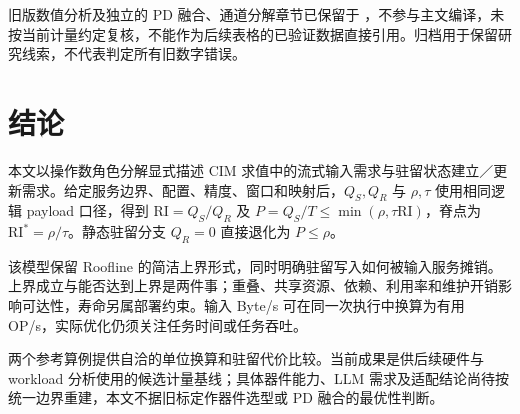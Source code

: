 \documentclass[11pt, a4paper]{ctexart}
\theoremstyle{definition}
\newcommand{\RI}{\mathrm{RI}}
\begin{document}
旧版数值分析及独立的 PD 融合、通道分解章节已保留于 ，不参与主文编译，未按当前计量约定复核，不能作为后续表格的已验证数据直接引用。归档用于保留研究线索，不代表判定所有旧数字错误。

\section{结论}
\label{sec:conclusion}

本文以操作数角色分解显式描述 CIM 求值中的流式输入需求与驻留状态建立／更新需求。给定服务边界、配置、精度、窗口和映射后，$Q_S,Q_R$ 与 $\rho,\tau$ 使用相同逻辑 payload 口径，得到 $\RI=Q_S/Q_R$ 及 $P=Q_S/T\le\min(\rho,\tau\RI)$，脊点为 $\RI^*=\rho/\tau$。静态驻留分支 $Q_R=0$ 直接退化为 $P\le\rho$。

该模型保留 Roofline 的简洁上界形式，同时明确驻留写入如何被输入服务摊销。上界成立与能否达到上界是两件事；重叠、共享资源、依赖、利用率和维护开销影响可达性，寿命另属部署约束。输入 Byte/s 可在同一次执行中换算为有用 OP/s，实际优化仍须关注任务时间或任务吞吐。

两个参考算例提供自洽的单位换算和驻留代价比较。当前成果是供后续硬件与 workload 分析使用的候选计量基线；具体器件能力、LLM 需求及适配结论尚待按统一边界重建，本文不据旧标定作器件选型或 PD 融合的最优性判断。
\end{document}
